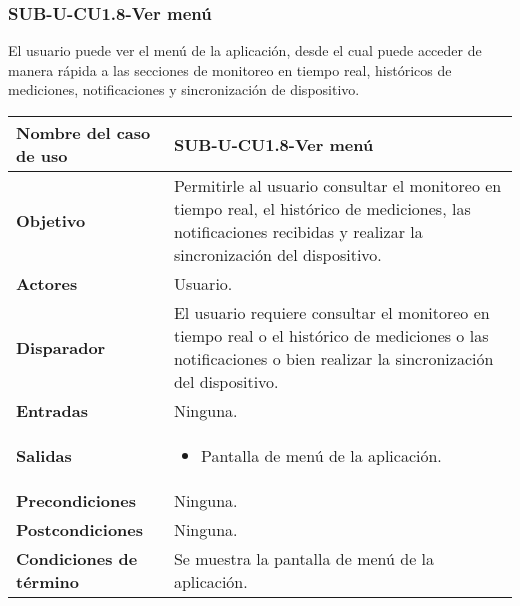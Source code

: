 \subsubsection{SUB-U-CU1.8-Ver menú}\label{SUB-U-CU1.8}
El usuario puede ver el menú de la aplicación, desde el cual puede acceder de manera rápida a las secciones de monitoreo en tiempo real, históricos de mediciones, notificaciones y sincronización de dispositivo.

\begin{longtable}{|J{5cm}|J{10.3cm}|}
	\hline
	\textbf{Nombre del caso de uso} &
		SUB-U-CU1.8-Ver menú \\ \hline
	\textbf{Objetivo} &
		Permitirle al usuario consultar el monitoreo en tiempo real, el histórico de mediciones, las notificaciones recibidas y realizar la sincronización del dispositivo. \\ \hline
	\textbf{Actores} &
		Usuario. \\ \hline 
	\textbf{Disparador} & 
		El usuario requiere consultar el monitoreo en tiempo real o el histórico de mediciones o las notificaciones o bien realizar la sincronización del dispositivo.\\ \hline 
	\textbf{Entradas} & Ninguna.
		\\ \hline 
	\textbf{Salidas} & 
		\begin{itemize}
			\item Pantalla de menú de la aplicación.
		\end{itemize} \\ \hline
	\textbf{Precondiciones} &
		Ninguna.\\ \hline
	\textbf{Postcondiciones} & Ninguna.
		\\ \hline
	\textbf{Condiciones de término} & Se muestra la pantalla de menú de la aplicación.

\end{longtable}
